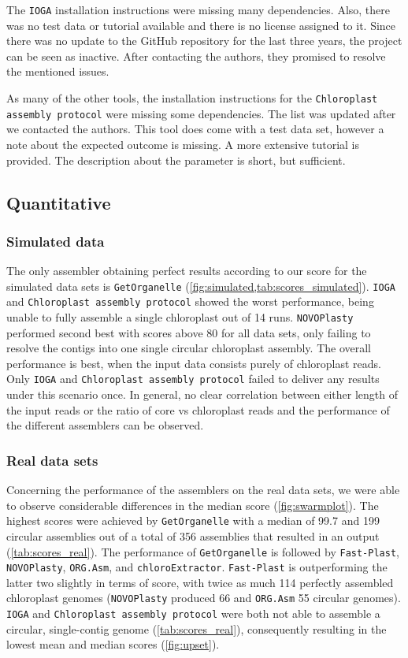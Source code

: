 \documentclass{bmcart}
\newcommand{\formatprogramnames}[1]{\texttt{#1}}
\newcommand{\ce}{\formatprogramnames{chloroExtractor}}
\newcommand{\oa}{\formatprogramnames{ORG.Asm}}
\newcommand{\fp}{\formatprogramnames{Fast-Plast}}
\newcommand{\ioga}{\formatprogramnames{IOGA}}
\newcommand{\np}{\formatprogramnames{NOVOPlasty}}
\newcommand{\go}{\formatprogramnames{GetOrganelle}}
\newcommand{\cassp}{\formatprogramnames{Chloroplast assembly protocol}}
\begin{document}
The \ioga{} installation instructions were missing many dependencies.
Also, there was no test data or tutorial available and there is no license assigned to it.
Since there was no update to the GitHub repository for the last three years, the project can be seen as inactive.
After contacting the authors, they promised to resolve the mentioned issues.

As many of the other tools, the installation instructions for the \cassp{} were missing some dependencies.
The list was updated after we contacted the authors.
This tool does come with a test data set, however a note about the expected outcome is missing.
A more extensive tutorial is provided.
The description about the parameter is short, but sufficient.

\subsection*{Quantitative}
\subsubsection*{Simulated data}
The only assembler obtaining perfect results according to our score for the simulated data sets is \go{} (\cref{fig:simulated,tab:scores_simulated}).
\ioga{} and \cassp{} showed the worst performance, being unable to fully assemble a single chloroplast out of \num{14} runs.
\np{} performed second best with scores above \num{80} for all data sets, only failing to resolve the contigs into one single circular chloroplast assembly.
The overall performance is best, when the input data consists purely of chloroplast reads.
Only \ioga{} and \cassp{} failed to deliver any results under this scenario once.
In general, no clear correlation between either length of the input reads or the ratio of core vs chloroplast reads and the performance of the different assemblers can be observed. 

\subsubsection*{Real data sets}
Concerning the performance of the assemblers on the real data sets, we were able to observe considerable differences in the median score (\cref{fig:swarmplot}).
The highest scores were achieved by \go{} with a median of \num{99.7} and \num{199} circular assemblies out of a total of 356 assemblies that resulted in an output (\cref{tab:scores_real}).
The performance of \go{} is followed by \fp{}, \np{}, \oa{}, and \ce{}. \fp{} is outperforming the latter two slightly in terms of score, with twice as much \num{114} perfectly assembled chloroplast genomes (\np{} produced \num{66} and \oa{} \num{55} circular genomes).
\ioga{} and \cassp{} were both not able to assemble a circular, single-contig genome (\cref{tab:scores_real}), consequently resulting in the lowest mean and median scores (\cref{fig:upset}).
\end{document}
